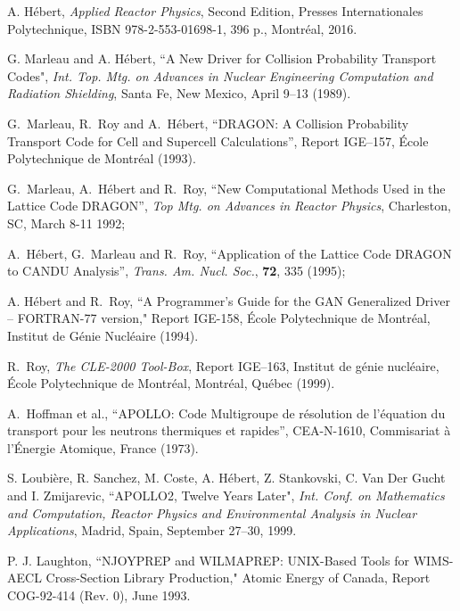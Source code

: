 \begin{thebibliography}{99}

A. H\'ebert, {\sl Applied Reactor Physics}, Second Edition, Presses Internationales Polytechnique, ISBN 978-2-553-01698-1, 396 p., Montr\'eal, 2016.

G. Marleau and A. H\'ebert, ``A New Driver for Collision Probability Transport
Codes", {\sl Int. Top. Mtg. on Advances in Nuclear Engineering
Computation and Radiation Shielding}, Santa Fe, New Mexico, April 9--13 (1989).

G.~Marleau, R.~Roy and A.~H\'{e}bert,
``DRAGON: A Collision Probability Transport Code for Cell and Supercell
Calculations'',  Report IGE--157,  \'{E}cole Polytechnique de Montr\'{e}al
(1993).

G.~Marleau, A.~H\'{e}bert and R.~Roy, ``New Computational Methods Used in
the Lattice Code DRAGON'',  {\sl Top Mtg. on Advances in Reactor Physics},
Charleston, SC, March 8-11 1992; 

A.~H\'{e}bert, G.~Marleau and R.~Roy, ``Application of the Lattice Code
DRAGON to CANDU Analysis'',  {\sl Trans. Am. Nucl. Soc.}, {\bf 72}, 335 (1995);

A. H\'ebert and R.~Roy, ``A Programmer's Guide for the GAN Generalized Driver --
FORTRAN-77 version," Report IGE-158, \'Ecole Polytechnique de Montr\'eal,
Institut de G\'enie Nucl\'eaire (1994).

R.~Roy, \textsl{The CLE-2000 Tool-Box}, 
Report IGE--163, Institut de g\'enie nucl\'eaire, \'{E}cole Polytechnique de Montr\'eal,
Montr\'{e}al, Qu\'{e}bec (1999).

A.~Hoffman et al., ``APOLLO: Code Multigroupe de r\'esolution de l'\'equation du
transport pour les neutrons  thermiques et rapides'', CEA-N-1610, Commisariat
\`a l'\'Energie Atomique, France (1973).

S. Loubi\`ere, R. Sanchez, M. Coste, A. H\'ebert, Z. Stankovski, C. Van Der Gucht and I. Zmijarevic, ``APOLLO2,
Twelve Years Later", {\sl Int. Conf. on Mathematics and Computation,
Reactor Physics and Environmental Analysis in Nuclear Applications}, Madrid, Spain, September 27--30, 1999.

P. J. Laughton, ``NJOYPREP and WILMAPREP: UNIX-Based Tools for WIMS-
AECL Cross-Section Library Production," Atomic Energy of Canada,
Report COG-92-414 (Rev. 0), June 1993.


\end{thebibliography}

